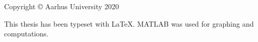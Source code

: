 \thispagestyle{empty}
{\small
\strut\vfill
\noindent Copyright \copyright{} Aarhus University 2020\par
\vspace{0.2cm}
\noindent This thesis has been typeset with \LaTeX. MATLAB was used
for graphing and computations.}
\clearpage